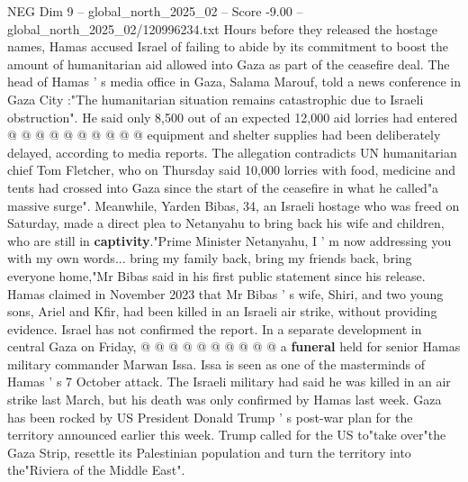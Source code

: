 \begin{textsample}{NEG Dim 9 – global\_north\_2025\_02 – Score -9.00 – global\_north\_2025\_02/120996234.txt}
Hours before they released the hostage names, Hamas accused Israel of failing to abide by its commitment to boost the amount of humanitarian aid allowed into Gaza as part of the ceasefire deal.
The head of Hamas ' s media office in Gaza, Salama Marouf, told a news conference in Gaza City :"The humanitarian situation remains catastrophic due to Israeli obstruction".
He said only 8,500 out of an expected 12,000 aid lorries had entered @ @ @ @ @ @ @ @ @ @ equipment and shelter supplies had been deliberately delayed, according to media reports.
The allegation contradicts UN humanitarian chief Tom Fletcher, who on Thursday said 10,000 lorries with food, medicine and tents had crossed into Gaza since the start of the ceasefire in what he called"a massive surge".
Meanwhile, Yarden Bibas, 34, an Israeli hostage who was freed on Saturday, made a direct plea to Netanyahu to bring back his wife and children, who are still in \textbf{captivity}."Prime Minister Netanyahu, I ' m now addressing you with my own words... bring my family back, bring my friends back, bring everyone home,"Mr Bibas said in his first public statement since his release.
Hamas claimed in November 2023 that Mr Bibas ' s wife, Shiri, and two young sons, Ariel and Kfir, had been killed in an Israeli air strike, without providing evidence.
Israel has not confirmed the report.
In a separate development in central Gaza on Friday, @ @ @ @ @ @ @ @ @ @ a \textbf{funeral} held for senior Hamas military commander Marwan Issa.
Issa is seen as one of the masterminds of Hamas ' s 7 October attack.
The Israeli military had said he was killed in an air strike last March, but his death was only confirmed by Hamas last week.
Gaza has been rocked by US President Donald Trump ' s post-war plan for the territory announced earlier this week.
Trump called for the US to"take over"the Gaza Strip, resettle its Palestinian population and turn the territory into the"Riviera of the Middle East".

\end{textsample}
